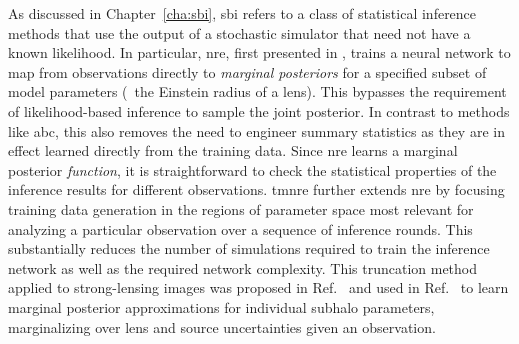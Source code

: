 As discussed in Chapter~\ref{cha:sbi}, \gls*{sbi} refers to a class of statistical inference methods that use the output of a stochastic simulator that need not have a known likelihood. In particular, \gls*{nre}, first presented in \cite{Hermans:2019ioj}, trains a neural network to map from observations directly to \emph{marginal posteriors} for a specified subset of model parameters (\eg~the Einstein radius of a lens). This bypasses the requirement of likelihood-based inference to sample the joint posterior. In contrast to methods like \gls*{abc}, this also removes the need to engineer summary statistics \cite{He:2020rkj} as they are in effect learned directly from the training data. Since \gls*{nre} learns a marginal posterior \emph{function}, it is straightforward to check the statistical properties of the inference results for different observations. \gls*{tmnre} further extends \gls*{nre} by focusing training data generation in the regions of parameter space most relevant for analyzing a particular observation over a sequence of inference rounds. This substantially reduces the number of simulations required to train the inference network as well as the required network complexity. This truncation method applied to strong-lensing images was proposed in Ref.~\cite{Karchev:2021fro} and used in Ref.~\cite{Coogan:2020yux} to learn marginal posterior approximations for individual subhalo parameters, marginalizing over lens and source uncertainties given an observation.

